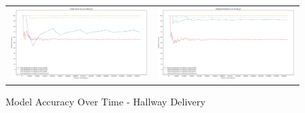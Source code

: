 \begin{figure}
  \begin{tabular}{cc}
    {\includegraphics[width = 3in]{images/results/Future_Predictions_on_hallway_D.png}} &
    {\includegraphics[width = 3in]{images/results/Historical_Predictions_on_hallway_D.png}} \\
  \end{tabular}
  \caption{Model Accuracy Over Time - Hallway Delivery}
\end{figure}\\ \\


